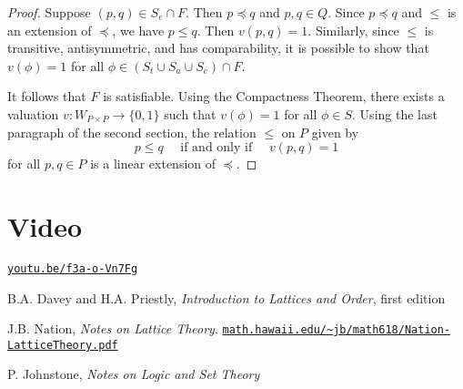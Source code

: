 \documentclass[12pt]{article}
\theoremstyle{definition}
\newcommand\conciseLink[1]{\href{https://#1}{\nolinkurl{#1}}}
\begin{document}
\begin{multicols*}{2}
\begin{proof}
	Suppose $(p,q)\in S_e\cap F$. Then $p\preceq q$ and $p,q\in Q$. Since $p\preceq q$ and $\leq$ is an extension of $\preceq$, we have $p\leq q$. Then $v(p,q)=1$. Similarly, since $\leq$ is transitive, antisymmetric, and has comparability, it is possible to show that $v(\phi)=1$ for all $\phi\in (S_t\cup S_a\cup S_c)\cap F$.
	
	It follows that $F$ is satisfiable. Using the Compactness Theorem, there exists a valuation $v: W_{P\times P}\rightarrow\{0,1\}$ such that $v(\phi)=1$ for all $\phi\in S$. Using the last paragraph of the second section, the relation $\leq$ on $P$ given by
	\[
		p\leq q\quad\text{ if and only if }\quad v(p,q)=1
	\]
	for all $p,q\in P$ is a linear extension of $\preceq$.
\end{proof}

\section*{Video}
\conciseLink{youtu.be/f3a-o-Vn7Fg}

\iffalse
\section*{Exercises}

\begin{enumerate}[label=\arabic*.]
	\item How many linear extensions does an antichain with $n\in\mathbb{N}$ elements have?
	
	\item Use the Compactness Theorem to prove Dilworth's Theorem for infinite posets of finite width.
\end{enumerate}

\section*{Further Reading}
\begin{enumerate}[label=(\arabic*)]
	\item \conciseLink{qchu.wordpress.com/2013/12/10/how-to-invent-intuitionistic-logic/}
	
	\item S. Vickers, \emph{Topology via Logic}
\end{enumerate}
\fi


\begin{thebibliography}{1}
	 B.A. Davey and H.A. Priestly, \emph{Introduction to Lattices and Order}, first edition
	
	 J.B. Nation, \emph{Notes on Lattice Theory}. \conciseLink{math.hawaii.edu/~jb/math618/Nation-LatticeTheory.pdf}
	
	 P. Johnstone, \emph{Notes on Logic and Set Theory}
\end{thebibliography}

\end{multicols*}
\end{document}
